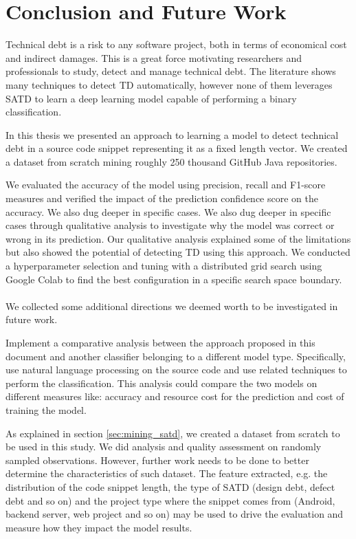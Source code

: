 \chapter{Conclusion and Future Work}

Technical debt is a risk to any software project, both in terms of economical cost and indirect damages. This is a great force motivating researchers and professionals to study, detect and manage technical debt. 
The literature shows many techniques to detect TD automatically, however none of them leverages SATD to learn a deep learning model capable of performing a binary classification.

In this thesis we presented an approach to learning a model to detect technical debt in a source code snippet representing it as a fixed length vector.
We created a dataset from scratch mining roughly 250 thousand GitHub Java repositories. 

We evaluated the accuracy of the model using precision, recall and F1-score measures and verified the impact of the prediction confidence score on the accuracy. We also dug deeper in specific cases. We also dug deeper in specific cases through qualitative analysis to investigate why the model was correct or wrong in its prediction. Our qualitative analysis explained some of the limitations but also showed the potential of detecting TD using this approach.
We conducted a hyperparameter selection and tuning with a distributed grid search using Google Colab to find the best configuration in a specific search space boundary.
\\
\\
We collected some additional directions we deemed worth to be investigated in future work.

Implement a comparative analysis between the approach proposed in this document and another classifier belonging to a different model type. Specifically, use natural language processing on the source code and use related techniques to perform the classification. This analysis could compare the two models on different measures like: accuracy and resource cost for the prediction and cost of training the model.

As explained in section \ref{sec:mining_satd}, we created a dataset from scratch to be used in this study. We did analysis and quality assessment on randomly sampled observations. However, further work needs to be done to better determine the characteristics of such dataset. The feature extracted, e.g. the distribution of the code snippet length, the type of SATD (design debt, defect debt and so on) and the project type where the snippet comes from (Android, backend server, web project and so on) may be used to drive the evaluation and measure how they impact the model results.

